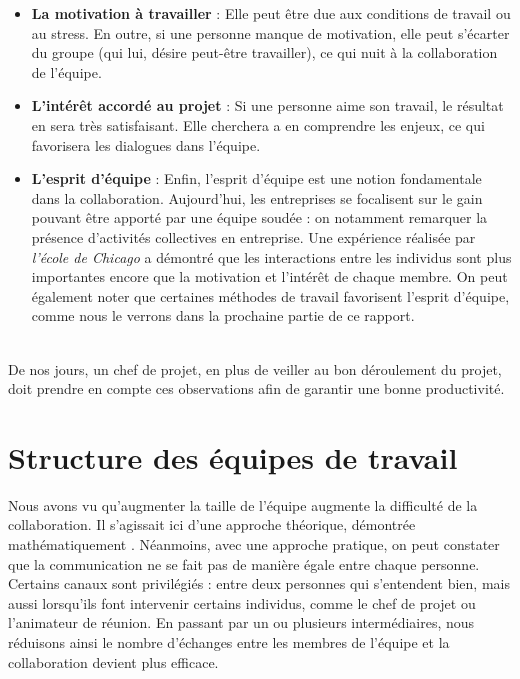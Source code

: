 \begin{itemize}
\item \textbf{La motivation à travailler} : Elle peut être due aux conditions de travail ou au stress. En outre, si une personne manque de motivation, elle peut s'écarter du groupe (qui lui, désire peut-être travailler), ce qui nuit à la collaboration de l'équipe.

\item \textbf{L'intérêt accordé au projet} : Si une personne aime son travail, le résultat en sera très satisfaisant. Elle cherchera a en comprendre les enjeux, ce qui favorisera les dialogues dans l'équipe.

\item \textbf{L'esprit d'équipe} : Enfin, l'esprit d'équipe est une notion fondamentale dans la collaboration. Aujourd'hui, les entreprises se focalisent sur le gain pouvant être apporté par une équipe soudée : on notamment remarquer la présence d'activités collectives en entreprise. Une expérience réalisée par \textit{l'école de Chicago} a démontré que les interactions entre les individus sont plus importantes encore que la motivation et l'intérêt de chaque membre. On peut également noter que certaines méthodes de travail favorisent l'esprit d'équipe, comme nous le verrons dans la prochaine partie de ce rapport.
\end{itemize}
~\\

De nos jours, un chef de projet, en plus de veiller au bon déroulement du projet, doit prendre en compte ces observations afin de garantir une bonne productivité.

\section{Structure des équipes de travail}

Nous avons vu qu'augmenter la taille de l'équipe augmente la difficulté de la collaboration. Il s'agissait ici d'une approche théorique, démontrée mathématiquement . Néanmoins, avec une approche pratique, on peut constater que la communication ne se fait pas de manière égale entre chaque personne. Certains canaux sont privilégiés : entre deux personnes qui s'entendent bien, mais aussi lorsqu'ils font intervenir certains individus, comme le chef de projet ou l'animateur de réunion. En passant par un ou plusieurs intermédiaires, nous réduisons ainsi le nombre d'échanges entre les membres de l'équipe et la collaboration devient plus efficace.\\

